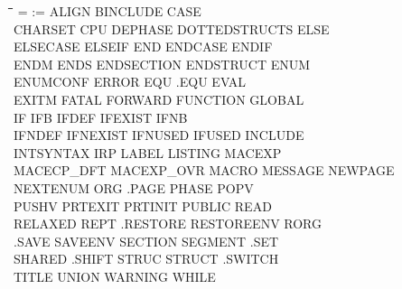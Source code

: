 {\tt\begin{tabbing}
\hspace{3cm}\=\hspace{3cm}\=\hspace{3cm}\=\hspace{3cm}\=\kill
=           \> :=          \> ALIGN       \> BINCLUDE    \> CASE \\
CHARSET     \> CPU         \> DEPHASE     \> DOTTEDSTRUCTS\> ELSE \\
ELSECASE    \> ELSEIF      \> END         \> ENDCASE     \> ENDIF \\
ENDM        \> ENDS        \> ENDSECTION  \> ENDSTRUCT   \> ENUM \\
ENUMCONF    \> ERROR       \> EQU         \> .EQU        \> EVAL \\
EXITM       \> FATAL       \> FORWARD     \> FUNCTION    \> GLOBAL \\
IF          \> IFB         \> IFDEF       \> IFEXIST     \> IFNB \\
IFNDEF      \> IFNEXIST    \> IFNUSED     \> IFUSED      \> INCLUDE \\
INTSYNTAX   \> IRP         \> LABEL       \> LISTING     \> MACEXP \\
MACECP\_DFT \> MACEXP\_OVR \> MACRO       \> MESSAGE     \> NEWPAGE \\
NEXTENUM    \> ORG         \> .PAGE       \> PHASE       \> POPV \\
PUSHV       \> PRTEXIT     \> PRTINIT     \> PUBLIC      \> READ \\
RELAXED     \> REPT        \> .RESTORE    \> RESTOREENV  \> RORG \\
.SAVE       \> SAVEENV     \> SECTION     \> SEGMENT     \> .SET \\
SHARED      \> .SHIFT      \> STRUC       \> STRUCT      \> .SWITCH \\
TITLE       \> UNION       \> WARNING     \> WHILE \\
\end{tabbing}}
